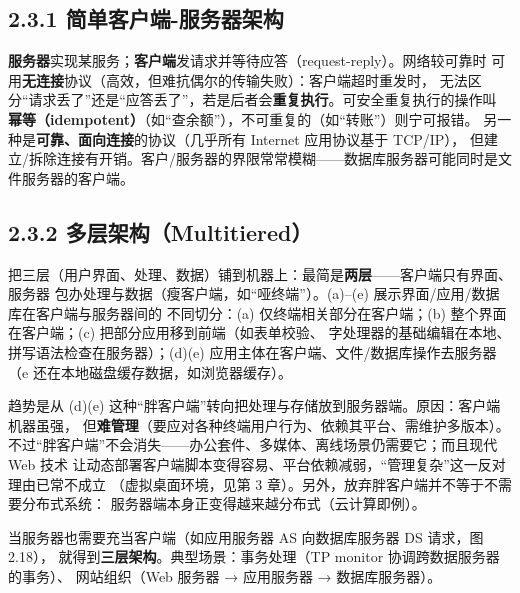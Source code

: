 \subsection*{2.3.1 简单客户端-服务器架构}
\textbf{服务器}实现某服务；\textbf{客户端}发请求并等待应答（request-reply）。网络较可靠时
可用\textbf{无连接}协议（高效，但难抗偶尔的传输失败）：客户端超时重发时，
无法区分“请求丢了”还是“应答丢了”，若是后者会\textbf{重复执行}。可安全重复执行的操作叫
\textbf{幂等（idempotent）}（如“查余额”），不可重复的（如“转账”）则宁可报错。
另一种是\textbf{可靠、面向连接}的协议（几乎所有 Internet 应用协议基于 TCP/IP），
但建立/拆除连接有开销。客户/服务器的界限常常模糊——数据库服务器可能同时是文件服务器的客户端。

\begin{closeread}
\end{closeread}

\subsection*{2.3.2 多层架构（Multitiered）}
把三层（用户界面、处理、数据）铺到机器上：最简是\textbf{两层}——客户端只有界面、服务器
包办处理与数据（瘦客户端，如“哑终端”）。(a)–(e) 展示界面/应用/数据库在客户端与服务器间的
不同切分：(a) 仅终端相关部分在客户端；(b) 整个界面在客户端；(c) 把部分应用移到前端（如表单校验、
字处理器的基础编辑在本地、拼写语法检查在服务器）；(d)(e) 应用主体在客户端、文件/数据库操作去服务器
（e 还在本地磁盘缓存数据，如浏览器缓存）。

\begin{ideabox}
趋势是从 (d)(e) 这种“胖客户端”转向把处理与存储放到服务器端。原因：客户端机器虽强，
但\textbf{难管理}（要应对各种终端用户行为、依赖其平台、需维护多版本）。
不过“胖客户端”不会消失——办公套件、多媒体、离线场景仍需要它；而且现代 Web 技术
让动态部署客户端脚本变得容易、平台依赖减弱，“管理复杂”这一反对理由已常不成立
（虚拟桌面环境，见第 3 章）。另外，放弃胖客户端并不等于不需要分布式系统：
服务器端本身正变得越来越分布式（云计算即例）。
\end{ideabox}

\noindent 当服务器也需要充当客户端（如应用服务器 AS 向数据库服务器 DS 请求，图 2.18），
就得到\textbf{三层架构}。典型场景：事务处理（TP monitor 协调跨数据服务器的事务）、
网站组织（Web 服务器 → 应用服务器 → 数据库服务器）。

\begin{closeread}
\end{closeread}

